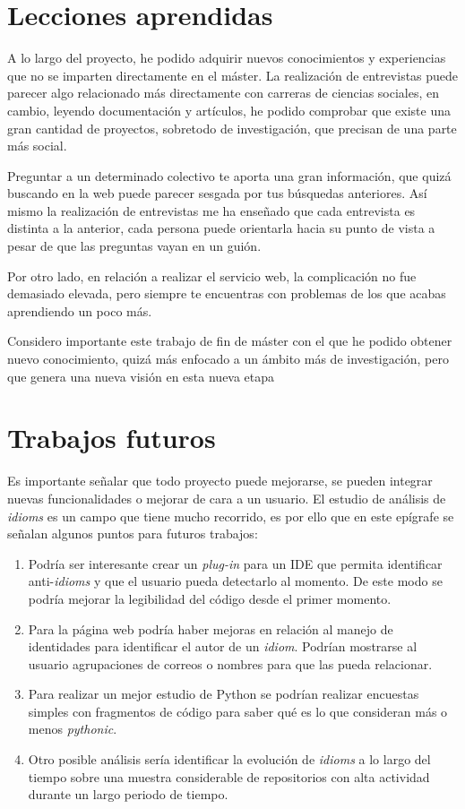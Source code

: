 \documentclass[a4paper, 12pt]{book}
\begin{document}
\section{Lecciones aprendidas}
\label{sec:lecciones_aprendidas}

A lo largo del proyecto, he podido adquirir nuevos conocimientos y experiencias que no se imparten directamente en el máster. 
La realización de entrevistas puede parecer algo relacionado más directamente con carreras de ciencias sociales, en cambio, leyendo documentación y artículos, he podido comprobar que existe una gran cantidad de proyectos, sobretodo de investigación, que precisan de una parte más social.

Preguntar a un determinado colectivo te aporta una gran información, que quizá buscando en la web puede parecer sesgada por tus búsquedas anteriores. Así mismo la realización de entrevistas me ha enseñado que cada entrevista es distinta a la anterior, cada persona puede orientarla hacia su punto de vista a pesar de que las preguntas vayan en un guión.

Por otro lado, en relación a realizar el servicio web, la complicación no fue demasiado elevada, pero siempre te encuentras con problemas de los que acabas aprendiendo un poco más.

Considero importante este trabajo de fin de máster con el que he podido obtener nuevo conocimiento, quizá más enfocado a un ámbito más de investigación, pero que genera una nueva visión en esta nueva etapa


\section{Trabajos futuros}
\label{sec:trabajos_futuros}

Es importante señalar que todo proyecto puede mejorarse, se pueden integrar nuevas funcionalidades o mejorar de cara a un usuario. El estudio de análisis de \textit{idioms} es un campo que tiene mucho recorrido, es por ello que en este epígrafe se señalan algunos puntos para futuros trabajos:
\begin{enumerate}
    \item Podría ser interesante crear un\textit{ plug-in} para un IDE que permita identificar anti-\textit{idioms} y que el usuario pueda detectarlo al momento. De este modo se podría mejorar la legibilidad del código desde el primer momento.
    \item Para la página web podría haber mejoras en relación al manejo de identidades para identificar el autor de un \textit{idiom}. Podrían mostrarse al usuario agrupaciones de correos o nombres para que las pueda relacionar.
    \item Para realizar un mejor estudio de Python se podrían realizar encuestas simples con fragmentos de código para saber qué es lo que consideran más o menos \textit{pythonic}.
    \item Otro posible análisis sería identificar la evolución de \textit{idioms} a lo largo del tiempo sobre una muestra considerable de repositorios con alta actividad durante un largo periodo de tiempo.
\end{enumerate}
\end{document}
